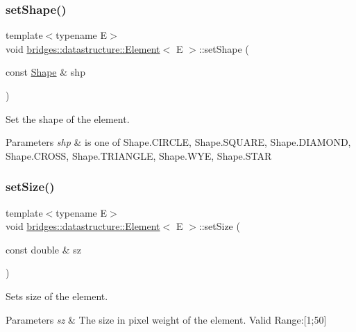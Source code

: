 \subsubsection{\texorpdfstring{set\+Shape()}{setShape()}}
{\footnotesize\ttfamily template$<$typename E$>$ \\
void \mbox{\hyperlink{classbridges_1_1datastructure_1_1_element}{bridges\+::datastructure\+::\+Element}}$<$ E $>$\+::set\+Shape (\begin{DoxyParamCaption}\item[{const \mbox{\hyperlink{namespacebridges_1_1datastructure_a3408f5f44d9c6062e5f3adb7e1bbb7f0}{Shape}} \&}]{shp }\end{DoxyParamCaption})\hspace{0.3cm}{\ttfamily [inline]}}



Set the shape of the element. 


\begin{DoxyParams}{Parameters}
{\em shp} & is one of Shape.\+C\+I\+R\+C\+LE, Shape.\+S\+Q\+U\+A\+RE, Shape.\+D\+I\+A\+M\+O\+ND, Shape.\+C\+R\+O\+SS, Shape.\+T\+R\+I\+A\+N\+G\+LE, Shape.\+W\+YE, Shape.\+S\+T\+AR \\
\hline
\end{DoxyParams}
\mbox{\label{classbridges_1_1datastructure_1_1_element_a3200b0ac712c1720db62d1f0bbcb14be}} 
\subsubsection{\texorpdfstring{set\+Size()}{setSize()}}
{\footnotesize\ttfamily template$<$typename E$>$ \\
void \mbox{\hyperlink{classbridges_1_1datastructure_1_1_element}{bridges\+::datastructure\+::\+Element}}$<$ E $>$\+::set\+Size (\begin{DoxyParamCaption}\item[{const double \&}]{sz }\end{DoxyParamCaption})\hspace{0.3cm}{\ttfamily [inline]}}



Sets size of the element. 


\begin{DoxyParams}{Parameters}
{\em sz} & The size in pixel weight of the element. Valid Range\+:\mbox{[}1;50\mbox{]} \\
\hline
\end{DoxyParams}
\mbox{\label{classbridges_1_1datastructure_1_1_element_a26f2aceb9eed7195fd55b3538f3c059f}} 
